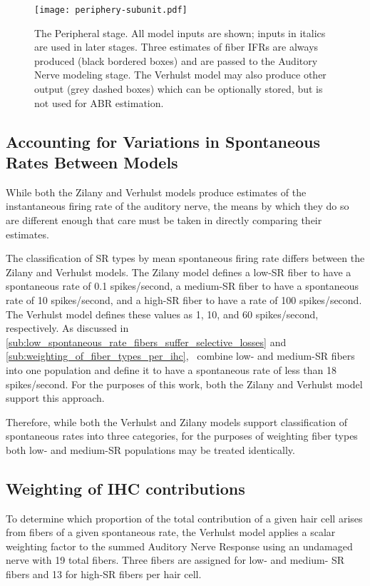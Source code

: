 \begin{figure}[htbp]
	\centering
	\texttt{[image: periphery-subunit.pdf]}
	\caption[The Peripheral Stage]{The Peripheral stage. All model inputs are shown; inputs in italics are used in later stages.  Three estimates of fiber IFRs are always produced (black bordered boxes) and are passed to the Auditory Nerve modeling stage.  The Verhulst model may also produce other output (grey dashed boxes) which can be optionally stored, but is not used for ABR estimation. }
	\label{fig:periphery-stage}
\end{figure}

\subsection{Accounting for Variations in Spontaneous Rates Between Models} %
\label{sub:interoperability_of_the_zilany_and_verhulst_models}
While both the Zilany and Verhulst models produce estimates of the instantaneous firing rate of the auditory nerve, the means by which they do so are different enough that care must be taken in directly comparing their estimates.  

The classification of SR types by mean spontaneous firing rate differs between the Zilany and Verhulst models.  The Zilany model defines a low-SR fiber to have a spontaneous rate of 0.1 spikes/second, a medium-SR fiber to have a spontaneous rate of 10 spikes/second, and a high-SR fiber to have a rate of 100 spikes/second.  The Verhulst model defines these values as 1, 10, and 60 spikes/second, respectively.  As discussed in \autoref{sub:low_spontaneous_rate_fibers_suffer_selective_losses} and \autoref{sub:weighting_of_fiber_types_per_ihc},~\cite{Temchin2008Threshold} combine low- and medium-SR fibers into one population and define it to have a spontaneous rate of less than 18 spikes/second.  For the purposes of this work, both the Zilany and Verhulst model support this approach.  

Therefore, while both the Verhulst and Zilany models support classification of spontaneous rates into three categories, for the purposes of weighting fiber types both low- and medium-SR populations may be treated identically.  

\subsection{Weighting of IHC contributions} %
\label{sub:weighting_of_ihc_contribution}
To determine which proportion of the total contribution of a given hair cell arises from fibers of a given spontaneous rate, the Verhulst model applies a scalar weighting factor to the summed Auditory Nerve Response using an undamaged nerve with 19 total fibers. Three fibers are assigned for low- and medium- SR fibers and 13 for high-SR fibers per hair cell. 

